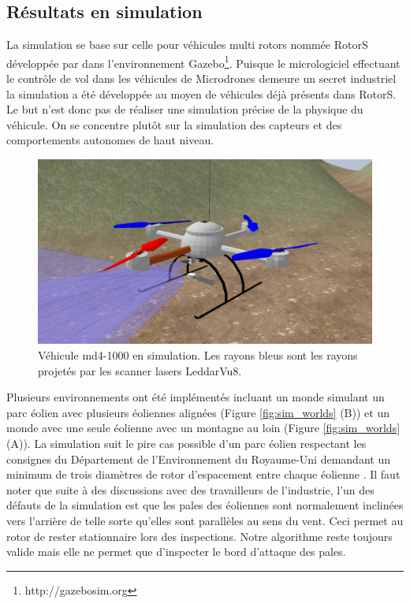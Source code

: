 \subsection{Résultats en simulation}
\label{subsec:results_simu}
La simulation se base sur celle pour véhicules multi rotors nommée RotorS développée par \citep{Furrer2016} dans l'environnement Gazebo\footnote{http://gazebosim.org}. Puisque le micrologiciel effectuant le contrôle de vol dans les véhicules de Microdrones demeure un secret industriel la simulation a été développée au moyen de véhicules déjà présents dans RotorS.
Le but n'est donc pas de réaliser une simulation précise de la physique du véhicule. On se concentre plutôt sur la simulation des capteurs et des comportements autonomes de haut niveau.

\begin{figure}[htp]
  \centering
    \centering
    \includegraphics[width=0.7\linewidth]{images/sim_vehicle_closeup.jpg}
  \caption{Véhicule md4-1000 en simulation. Les rayons bleus sont les rayons projetés par les scanner lasers LeddarVu8.}
  \label{fig:sim_vehicle_closeup}
\end{figure}

Plusieurs environnements ont été implémentés incluant un monde simulant un parc éolien avec plusieurs éoliennes alignées (Figure \ref{fig:sim_worlds} (B)) et un monde avec une seule éolienne avec un montagne au loin (Figure \ref{fig:sim_worlds} (A)). La simulation suit le pire cas possible d'un parc éolien respectant les consignes du Département de l'Environnement du Royaume-Uni demandant un minimum de trois diamètres de rotor d'espacement entre chaque éolienne \citep{DOE2009}. Il faut noter que suite à des discussions avec des travailleurs de l'industrie, l'un des défauts de la simulation est que les pales des éoliennes sont normalement inclinées vers l'arrière de telle sorte qu'elles sont parallèles au sens du vent. Ceci permet au rotor de rester stationnaire lors des inspections. Notre algorithme reste toujours valide mais elle ne permet que d'inspecter le bord d'attaque des pales.

